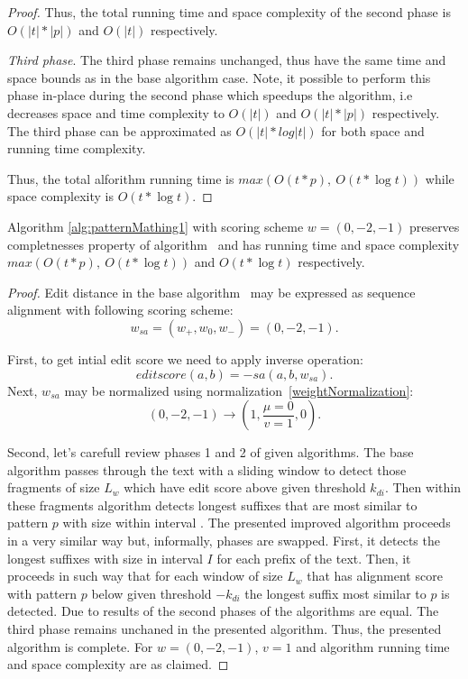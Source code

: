 \begin{proof}
Thus, the total running time and space complexity of the second phase is $O(|t|*|p|)$ and $O(|t|)$ respectively.

\emph{Third phase}.
The third phase remains unchanged, thus have the same time and space bounds as in the base algorithm case.
Note, it possible to perform this phase in-place during the second phase which speedups the algorithm, i.e decreases space and time complexity to $O(|t|)$ and $O(|t|*|p|)$ respectively.
The third phase can be approximated as $O(|t| * log|t|)$ for both space and running time complexity.

Thus, the total alforithm running time is $max(O(t * p),\ O(t * \log t))$ while space complexity is $O(t * \log t)$.
\end{proof}

\begin{theorem}
Algorithm \ref{alg:patternMathing1} with scoring scheme $w = (0,-2,-1)$ preserves completnesses property of algorithm~\cite{luciv2019interactive} and has running time and space complexity $max(O(t*p),\ O(t* \log t))$ and $O(t *  \log t)$  respectively.
\end{theorem}

\begin{proof}
Edit distance in the base algorithm~\cite{.} may be expressed as sequence alignment with following scoring scheme: 
$$w_{sa}=(w_{+},w_{0},w_{-}) = (0,-2,-1).$$

First, to get intial edit score we need to apply inverse operation:
$$editscore(a,b) = -sa(a,b,w_{sa}).$$
Next, $w_{sa}$ may be normalized using normalization~\ref{weightNormalization}:
$$(0, -2, -1) \rightarrow (1,\frac{\mu=0}{v=1}, 0).$$

Second, let's carefull review phases 1 and 2 of given algorithms.
The base algorithm passes through the text with a sliding window to detect those fragments of size $L_{w}$ which have edit score above given threshold $k_{di}$.
Then within these fragments algorithm detects longest suffixes that are most similar to pattern $p$ with size within interval .
The presented improved algorithm proceeds in a very similar way but, informally, phases are swapped.
First, it detects the longest suffixes with size in interval $I$ for each prefix of the text.
Then, it proceeds in such way that for each window of size $L_{w}$ that has alignment score with pattern $p$ below given threshold $-k_{di}$  the longest suffix most similar to $p$ is detected.
Due to  results of the second phases of the algorithms are equal.
The third phase remains unchaned in the presented algorithm.
Thus, the presented algorithm is complete.
For $w = (0,-2,-1)$, $v=1$ and algorithm running time and space complexity are as claimed.
\end{proof}

